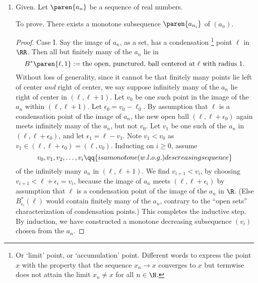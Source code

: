 \documentclass[onesided]{ccg-pset}
\begin{document}
\begin{enumerate}
\begin{proof}
Passing to the limit as $\epsilon \to 0$ crushes the powers of $\epsilon$, hence 
\begin{equation*}
 \limsup a_n b_n  \le u\ell = \limsup a_n \cdot \limsup b_n,
\end{equation*}
as desired.
\end{proof}

\item Given. Let $\paren{a_n}$ be a sequence of real numbers. 

    To prove. There exists a monotone subsequence $\paren{a_{n_i}}$ of $(a_n)$.

\begin{proof}
    Case I. Say the image of $a_n$, as a set, has a condensation%
        \footnote{%
        Or `limit' point, or `accumulation' point. Different words to express the point $x$ with the property that the sequence $x_n \to x$ converges to $x$ but termwise does not attain the limit $x_n \neq x$ for all $n \in \N$.
        }
    point $\ell$ in $\RR$. Then all but finitely many of the $a_n$ lie in \[B^*\paren{\ell, 1} := \text{the open, punctured, ball centered at $\ell$ with radius $1$}.\] 
    Without loss of generality, since it cannot be that finitely many points lie left of center \emph{and} right of center, we say suppose infinitely many of the $a_n$ lie right of center in $(\ell, \ell + 1)$. Let $v_0$ be one such point in the image of the $a_n$ within $(\ell, \ell+1)$. Let $\epsilon_0 = v_0 - \ell_0$. By assumption that $\ell$ is a condensation point of the image of $a_n$, the new open ball $(\ell, \ell + \epsilon_0)$ again meets infinitely many of the $a_n$, but not $v_0$. Let $v_1$ be one such of the $a_n$ in $(\ell, \ell + \epsilon_0)$, and let $\epsilon_1 = \ell - v_1$. Note $v_1 < v_0$ as $v_1 \in (\ell, \ell + \epsilon_0) = (\ell, v_0)$. Inducting on $i \ge 0$, assume 
    \begin{equation*}
        v_0, v_1, v_2, \ldots, v_i \qq{is a monotone (w.l.o.g.) descreasing sequence}
    \end{equation*}
    of the infinitely many $a_n$ in $(\ell, \ell + 1)$. We find $v_{i+1} < v_i$, by choosing $v_{i+1} < \ell + \epsilon_i = v_i$, because the image of $a_n$ meets $(\ell,\ell+\epsilon_i)$ by assumption that $\ell$ is a condensation point of the image of the $a_n$ in $\R$. (Else $B^*_{\epsilon_i}(\ell)$ would contain finitely many of the $a_n$, contrary to the ``open sets'' characterization of condensation points.) This completes the inductive step. By induction, we have constructed a monotone decreasing subsequence $(v_i)$ chosen from the $a_n$.


\end{proof}
\end{enumerate}
\end{document}
